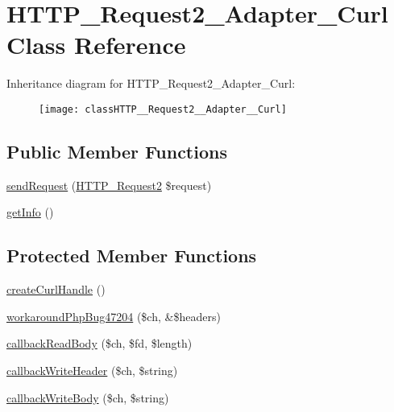 \hypertarget{classHTTP__Request2__Adapter__Curl}{}\section{H\+T\+T\+P\+\_\+\+Request2\+\_\+\+Adapter\+\_\+\+Curl Class Reference}
\label{classHTTP__Request2__Adapter__Curl}
Inheritance diagram for H\+T\+T\+P\+\_\+\+Request2\+\_\+\+Adapter\+\_\+\+Curl\+:\begin{figure}[H]
\begin{center}
\leavevmode
\texttt{[image: classHTTP\_\_Request2\_\_Adapter\_\_Curl]}
\end{center}
\end{figure}
\subsection*{Public Member Functions}
\begin{DoxyCompactItemize}
\item 
\hyperlink{classHTTP__Request2__Adapter__Curl_a9da450eb1bb1492d1b39c22c2f29bb2b}{send\+Request} (\hyperlink{classHTTP__Request2}{H\+T\+T\+P\+\_\+\+Request2} \$request)
\item 
\hyperlink{classHTTP__Request2__Adapter__Curl_a9c8c318ec7a6314f235ef4dfea89e6b2}{get\+Info} ()
\end{DoxyCompactItemize}
\subsection*{Protected Member Functions}
\begin{DoxyCompactItemize}
\item 
\hyperlink{classHTTP__Request2__Adapter__Curl_a905d9fdfe01867e54cbd696091d97516}{create\+Curl\+Handle} ()
\item 
\hyperlink{classHTTP__Request2__Adapter__Curl_a3e62b54a633faf5aba9d0b4eb0a3c1d0}{workaround\+Php\+Bug47204} (\$ch, \&\$headers)
\item 
\hyperlink{classHTTP__Request2__Adapter__Curl_a02043fb25c4aa88dfe000cbb037011b0}{callback\+Read\+Body} (\$ch, \$fd, \$length)
\item 
\hyperlink{classHTTP__Request2__Adapter__Curl_a8279ebf99b6de452d163e747f34d6f11}{callback\+Write\+Header} (\$ch, \$string)
\item 
\hyperlink{classHTTP__Request2__Adapter__Curl_ad1049b669850af2040d3360144f90e8c}{callback\+Write\+Body} (\$ch, \$string)
\end{DoxyCompactItemize}
